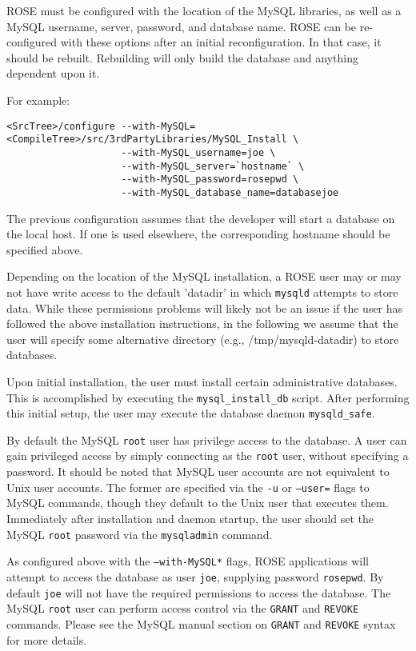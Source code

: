 \documentclass[times, 10pt]{book}
\begin{document}
ROSE must be configured with the location of the MySQL libraries, as well
as a MySQL username, server, password, and database name.  ROSE can be 
re-configured with these options after an initial reconfiguration.  In
that case, it should be rebuilt.  Rebuilding will only build the
database and anything dependent upon it.

For example:

\begin{verbatim}
<SrcTree>/configure --with-MySQL=<CompileTree>/src/3rdPartyLibraries/MySQL_Install \
                    --with-MySQL_username=joe \
                    --with-MySQL_server=`hostname` \
                    --with-MySQL_password=rosepwd \
                    --with-MySQL_database_name=databasejoe
\end{verbatim}

The previous configuration assumes that the developer will start a database
on the local host.  If one is used elsewhere, the corresponding hostname
should be specified above.

Depending on the location of the MySQL installation, a ROSE user may or
may not have write access to the default 'datadir' in which {\tt mysqld}
attempts to store data.  While these permissions problems will likely not
be an issue if the user has followed the above installation instructions,
in the following we assume that the user will specify some alternative
directory (e.g., /tmp/mysqld-datadir) to store databases.

Upon initial installation, the user must install certain administrative
databases.  This is accomplished by executing the {\tt mysql\_install\_db}
script.  After performing this initial setup, the user may
execute the database daemon {\tt mysqld\_safe}.  

By default the MySQL {\tt root} user has privilege access to the database.
A user can gain privileged access by simply connecting as the {\tt root}
user, without specifying a password.  It should be noted that MySQL
user accounts are not equivalent to Unix user accounts.  The former are
specified via the {\tt -u} or {\tt --user=} flags to MySQL commands,
though they default to the Unix user that executes them.  Immediately
after installation and daemon startup, the user should set the MySQL
{\tt root} password via the {\tt mysqladmin} command.  

As configured above with the {\tt --with-MySQL*} flags, ROSE applications
will attempt to access the database as user {\tt joe}, supplying
password {\tt rosepwd}.  By default {\tt joe} will not have the required
permissions to access the database.  The MySQL {\tt root} user can
perform access control via the {\tt GRANT} and {\tt REVOKE} commands.
Please see the MySQL manual section on {\tt GRANT} and {\tt REVOKE} syntax
for more details.
\end{document}
